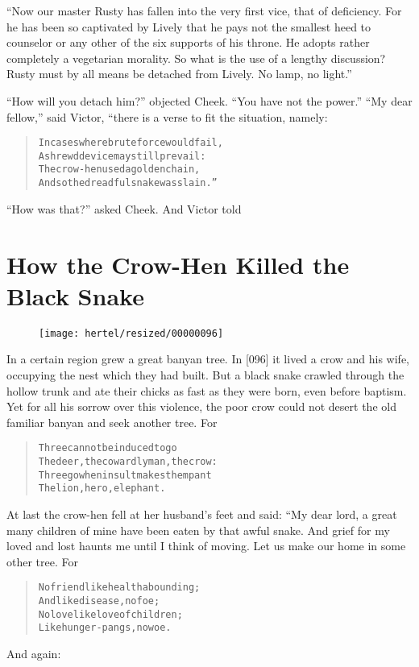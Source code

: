 \documentclass[article, twoside, 10pt]{memoir}
\renewenvironment{verbatim}{%
\begin{quote}%
\vskip -10pt%
\begin{alltt}\normalfont\small}{\end{alltt}%
\end{quote}%
\vskip -10pt
} %
\begin{document}
``Now our master Rusty has fallen into the very first vice, that of deficiency. For he has been so captivated by Lively that he pays not the smallest heed to counselor or any other of the six supports of his throne. He adopts rather completely a vegetarian morality. So what is the use of a lengthy discussion? Rusty must by all means be detached from Lively. No lamp, no light.''

``How will you detach him?'' objected Cheek.
``You have not the power.'' ``My dear fellow,'' said Victor, “there
is a verse to fit the situation, namely:

\begin{verbatim}
In cases where brute force would fail,
    A shrewd device may still prevail:
The crow-hen used a golden chain,
    And so the dreadful snake was slain.”
\end{verbatim}
``How was that?'' asked Cheek. And Victor told

\chapter{How the Crow-Hen Killed the Black Snake}

\begin{figure}[p]\texttt{[image: hertel/resized/00000096]}\end{figure}In a certain region grew a great banyan tree. In [096] it lived a
crow and his wife, occupying the nest which they had built. But a
black snake crawled through the hollow trunk and ate their chicks
as fast as they were born, even before baptism. Yet for all his
sorrow over this violence, the poor crow could not desert the old
familiar banyan and seek another tree. For

\begin{verbatim}
Three cannot be induced to go{\textemdash}
The deer, the cowardly man, the crow:
Three go when insult makes them pant{\textemdash}
The lion, hero, elephant.
\end{verbatim}
At last the crow-hen fell at her husband's feet and said: “My dear
lord, a great many children of mine have been eaten by that awful
snake. And grief for my loved and lost haunts me until I think of
moving. Let us make our home in some other tree. For

\begin{verbatim}
No friend like health abounding;
    And like disease, no foe;
No love like love of children;
    Like hunger-pangs, no woe.
\end{verbatim}
And again:
\end{document}
